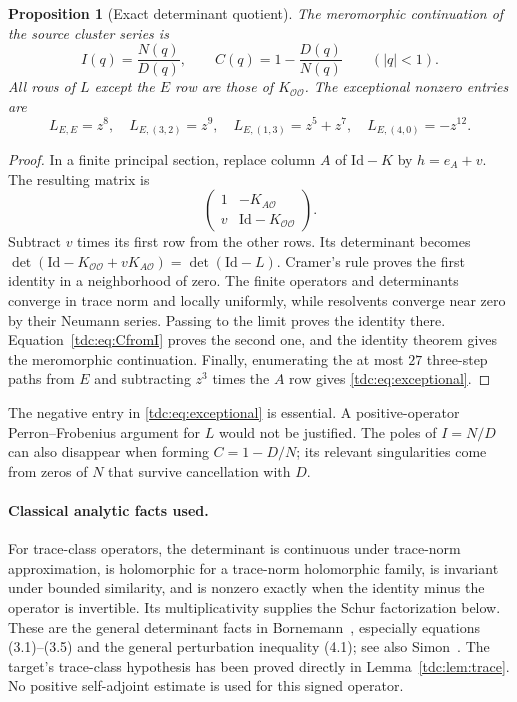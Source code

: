 \documentclass[11pt]{article}
\newtheorem{proposition}[theorem]{Proposition}
\theoremstyle{definition}\newtheorem{definition}[theorem]{Definition}
\theoremstyle{remark}\newtheorem{remark}[theorem]{Remark}
\newcommand{\Id}{\mathrm{Id}}
\newcommand{\OO}{\mathcal O}
\begin{document}
\begin{proposition}[Exact determinant quotient]\label{tdc:prop:quotient}
The meromorphic continuation of the source cluster series is
\begin{equation}\label{tdc:eq:detquotient}
 I(q)=\frac{N(q)}{D(q)},\qquad C(q)=1-\frac{D(q)}{N(q)}\qquad(|q|<1).
\end{equation}
All rows of $L$ except the $E$ row are those of $K_{\OO\OO}$. The exceptional nonzero entries are
\begin{equation}\label{tdc:eq:exceptional}
 L_{E,E}=z^8,\quad L_{E,(3,2)}=z^9,\quad
 L_{E,(1,3)}=z^5+z^7,\quad L_{E,(4,0)}=-z^{12}.
\end{equation}
\end{proposition}
\begin{proof}
In a finite principal section, replace column $A$ of $\Id-K$ by $h=e_A+v$. The resulting matrix is
\[
 \begin{pmatrix}1&-K_{A\OO}\\v&\Id-K_{\OO\OO}\end{pmatrix}.
\]
Subtract $v$ times its first row from the other rows. Its determinant becomes $\det(\Id-K_{\OO\OO}+vK_{A\OO})=\det(\Id-L)$. Cramer's rule proves the first identity in a neighborhood of zero. The finite operators and determinants converge in trace norm and locally uniformly, while resolvents converge near zero by their Neumann series. Passing to the limit proves the identity there. Equation~\eqref{tdc:eq:CfromI} proves the second one, and the identity theorem gives the meromorphic continuation. Finally, enumerating the at most $27$ three-step paths from $E$ and subtracting $z^3$ times the $A$ row gives \eqref{tdc:eq:exceptional}.
\end{proof}

The negative entry in \eqref{tdc:eq:exceptional} is essential. A positive-operator Perron--Frobenius argument for $L$ would not be justified. The poles of $I=N/D$ can also disappear when forming $C=1-D/N$; its relevant singularities come from zeros of $N$ that survive cancellation with $D$.

\paragraph{Classical analytic facts used.}
For trace-class operators, the determinant is continuous under trace-norm approximation, is holomorphic for a trace-norm holomorphic family, is invariant under bounded similarity, and is nonzero exactly when the identity minus the operator is invertible. Its multiplicativity supplies the Schur factorization below. These are the general determinant facts in Bornemann~\cite[Sections 2--4]{bornemann}, especially equations (3.1)--(3.5) and the general perturbation inequality (4.1); see also Simon~\cite{simon}. The target's trace-class hypothesis has been proved directly in Lemma~\ref{tdc:lem:trace}. No positive self-adjoint estimate is used for this signed operator.
\end{document}
